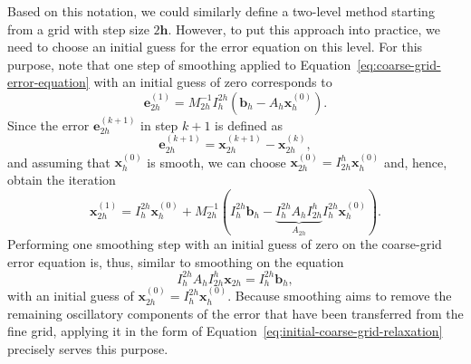 Based on this notation, we could similarly define a two-level method starting from a grid with step size $2\bm{h}$.
However, to put this approach into practice, we need to choose an initial guess for the error equation on this level.
For this purpose, note that one step of smoothing applied to Equation~\eqref{eq:coarse-grid-error-equation} with an initial guess of zero corresponds to
\begin{equation}
	\bm{e}_{2h}^{(1)} = M_{2h}^{-1} I_{h}^{2h} \left(\bm{b}_h - A_h \bm{x}^{(0)}_h\right).
	\label{eq:initial-coarse-grid-relaxation}
\end{equation}
Since the error $\bm{e}_{2h}^{(k+1)}$ in step $k+1$ is defined as
\begin{equation*}
	\bm{e}_{2h}^{(k+1)} = \bm{x}_{2h}^{(k+1)} - \bm{x}_{2h}^{(k)},
\end{equation*}
and assuming that $\bm{x}_{h}^{(0)}$ is smooth, we can choose $\bm{x}_{2h}^{(0)} = I_{2h}^{h} \bm{x}_{h}^{(0)}$ and, hence, obtain the iteration
\begin{equation}
	\bm{x}_{2h}^{(1)} = I_{h}^{2h} \bm{x}_{h}^{(0)} + M_{2h}^{-1} ( I_{h}^{2h} \bm{b}_h - \underbrace{I_{h}^{2h} A_h I_{2h}^{h}}_{A_{2h}} I_{h}^{2h} \bm{x}_{h}^{(0)} ).
\end{equation}
Performing one smoothing step with an initial guess of zero on the coarse-grid error equation is, thus, similar to smoothing on the equation
\begin{equation}
	I_{h}^{2h} A_h I_{2h}^h \bm{x}_{2h} = I_{h}^{2h} \bm{b}_h,
\end{equation}
with an initial guess of $\bm{x}_{2h}^{(0)} = I_{h}^{2h} \bm{x}_{h}^{(0)}$.
Because smoothing aims to remove the remaining oscillatory components of the error that have been transferred from the fine grid, applying it in the form of Equation~\eqref{eq:initial-coarse-grid-relaxation} precisely serves this purpose.

